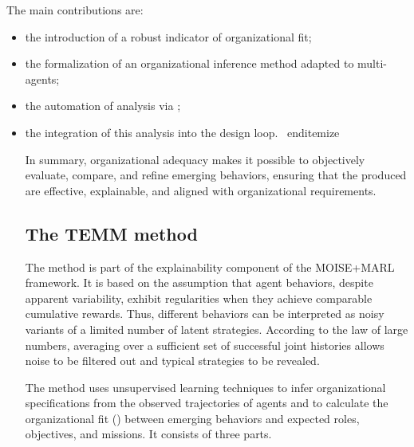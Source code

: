 The main contributions are:
\begin{itemize}
  \item the introduction of a robust indicator of organizational fit;
  \item the formalization of an organizational inference method adapted to multi-agents;
  \item the automation of analysis via ;
  \item the integration of this analysis into the  design loop.
        \ end{itemize}

        In summary, organizational adequacy makes it possible to objectively evaluate, compare, and refine emerging behaviors, ensuring that the  produced are effective, explainable, and aligned with organizational requirements.

        \subsection{The TEMM method}
        \label{sec:TEMM_algorithm}

        The  method is part of the explainability component of the MOISE+MARL framework. It is based on the assumption that agent behaviors, despite apparent variability, exhibit regularities when they achieve comparable cumulative rewards. Thus, different behaviors can be interpreted as noisy variants of a limited number of latent strategies. According to the law of large numbers, averaging over a sufficient set of successful joint histories allows noise to be filtered out and typical strategies to be revealed.

        The method uses unsupervised learning techniques to infer organizational specifications from the observed trajectories of agents and to calculate the organizational fit () between emerging behaviors and expected roles, objectives, and missions. It consists of three parts.


\end{itemize}
